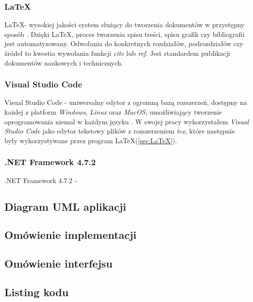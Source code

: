 \documentclass{article}
\begin{document}
        \subsubsection{\LaTeX}
        {
            \label{sec:LaTeX}
            \Large
            \justifying
            \LaTeX - wysokiej jakości system służący do tworzenia dokumentów w przystępny sposób \cite{LaTeX}.
            Dzięki \LaTeX, proces tworzenia spisu treści, spisu grafik czy bibliografii jest automatyzowany.
            Odwołania do konkretnych rozdziałów, podrozdziałów czy źródeł to kwestia wywołania funkcji \emph{cite} lub \emph{ref}.
            Jest standardem publikacji dokumentów naukowych i technicznych.
        }
        \subsubsection{Visual Studio Code}
        {
            \label{sec:VisualStudioCode}
            \Large
            \justifying
            \quad
            Visual Studio Code - uniwersalny edytor z ogromną bazą rozszerzeń, dostępny na każdej z platform \emph{Windows}, \emph{Linux} oraz \emph{MacOS}, umożliwiający tworzenie oprogramowania niemal w każdym języku \cite{VSCode}.
            W swojej pracy wykorzystałem \emph{Visual Studio Code} jako edytor tekstowy plików z rozszerzeniem \emph{tex}, które następnie były wykorzystywane przez program \LaTeX (\ref{sec:LaTeX}).
        }
        \subsubsection{.NET Framework 4.7.2}
        {
            \label{sec:.NETFramework 4.7.2}
            \Large
            \justifying
            \quad
            .NET Framework 4.7.2 - 
        }

        \subsection{Diagram UML aplikacji}
        \subsection{Omówienie implementacji}
        \subsection{Omówienie interfejsu}
        \subsection{Listing kodu}
    \newpage
\end{document}
